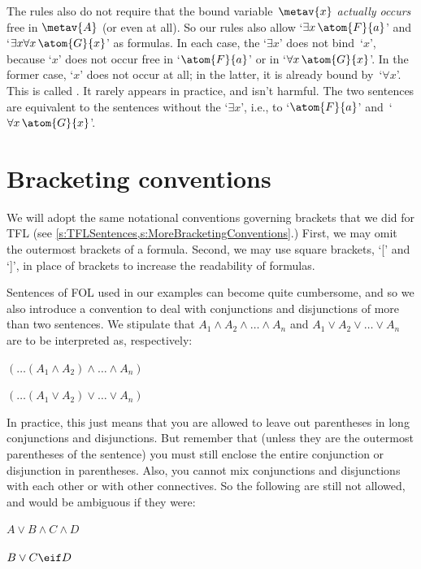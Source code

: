 The rules also do not require that the bound variable~$\metav{x}$
\emph{actually occurs} free in $\metav{A}$ (or even at all). So our
rules also allow `$\exists x\,\atom{F}{a}$' and `$\exists x\forall
x\,\atom{G}{x}$' as formulas. In each case, the `$\exists x$' does not
bind~`$x$', because `$x$' does not occur free in `$\atom{F}{a}$' or in
`$\forall x\,\atom{G}{x}$'. In the former case, `$x$' does not occur at
all; in the latter, it is already bound by~`$\forall x$'. This is called
. It rarely appears in practice, and
isn't harmful. The two sentences are equivalent to the sentences
without the `$\exists x$', i.e., to `$\atom{F}{a}$' and~`$\forall
x\,\atom{G}{x}$'.

\section{Bracketing conventions}

We will adopt the same notational conventions governing brackets that we did for TFL (see \cref{s:TFLSentences,s:MoreBracketingConventions}.) First, we may omit the outermost brackets of a formula.  Second, we may use square brackets, `[' and `]', in place of brackets to increase the readability of formulas.

Sentences of FOL used in our examples can become quite cumbersome, and so we also introduce a convention to deal with conjunctions and disjunctions of more than two sentences. We stipulate that $A_1 \land A_2 \land \dots \land A_n$ and $A_1 \lor A_2 \lor \dots \lor A_n$ are to be interpreted as, respectively:
\begin{earg}
	\item[] $(\dots(A_1 \land A_2) \land \dots \land A_n)$
	\item[] $(\dots(A_1 \lor A_2) \lor \dots \lor A_n)$
\end{earg}
In practice, this just means that you are allowed to leave out parentheses in long conjunctions and disjunctions. But remember that (unless they are the outermost parentheses of the sentence) you must still enclose the entire conjunction or disjunction in parentheses. Also, you cannot mix conjunctions and disjunctions with each other or with other connectives. So the following are still not allowed, and would be ambiguous if they were:
\begin{earg}
	\item[] $A \lor B \land C \land D$
	\item[] $B \lor C \eif D$
\end{earg}

